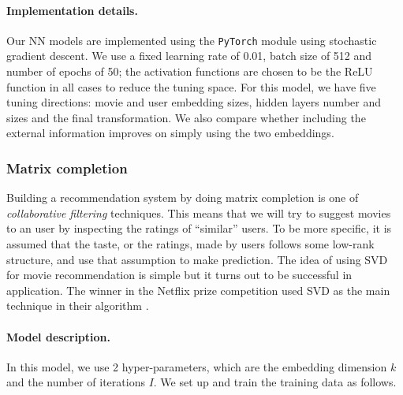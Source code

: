 \documentclass[bj, preprint]{imsart}
\begin{document}
\paragraph{Implementation details.}\label{par:method.models.nn.impl}

Our NN models are implemented using the \texttt{PyTorch} module \citep{paszke2017automatic} using stochastic gradient descent. We use a fixed learning rate of \num{0.01}, batch size of \num{512} and number of epochs of \num{50}; the activation functions are chosen to be the ReLU function in all cases to reduce the tuning space. For this model, we have five tuning directions: movie and user embedding sizes, hidden layers number and sizes and the final transformation. We also compare whether including the external information improves on simply using the two embeddings.

\subsubsection{Matrix completion}\label{subsubsec:method.models.svd}
Building a recommendation system by doing matrix completion is one of \textit{collaborative filtering} techniques. This means that we will try to suggest movies to an user by inspecting the ratings of ``similar'' users. To be more specific, it is assumed that the taste, or the ratings, made by users follows some low-rank structure, and use that assumption to make prediction. The idea of using SVD for movie recommendation is simple but it turns out to be successful in application. The winner in the Netflix prize competition used SVD as the main technique in their algorithm \citep{bennett2007netflix}. 

\paragraph{Model description.}\label{par:method.models.svd.model}
In this model, we use 2 hyper-parameters, which are the embedding dimension $k$ and the number of iterations $I$. We set up and train the training data as follows.
\end{document}
